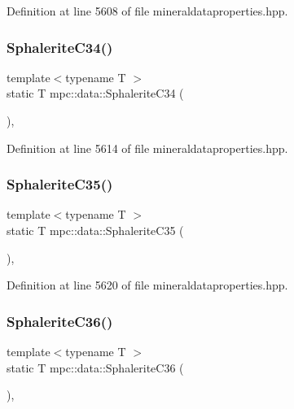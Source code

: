 Definition at line 5608 of file mineraldataproperties.\+hpp.

\mbox{\label{namespacempc_1_1data_afcf69c5d36c89b18b1465d54f28b648e}} 
\subsubsection{\texorpdfstring{Sphalerite\+C34()}{SphaleriteC34()}}
{\footnotesize\ttfamily template$<$typename T $>$ \\
static T mpc\+::data\+::\+Sphalerite\+C34 (\begin{DoxyParamCaption}{ }\end{DoxyParamCaption})\hspace{0.3cm}{\ttfamily [inline]}, {\ttfamily [static]}}



Definition at line 5614 of file mineraldataproperties.\+hpp.

\mbox{\label{namespacempc_1_1data_aa2576bc083b3212de07d691f4a7da4db}} 
\subsubsection{\texorpdfstring{Sphalerite\+C35()}{SphaleriteC35()}}
{\footnotesize\ttfamily template$<$typename T $>$ \\
static T mpc\+::data\+::\+Sphalerite\+C35 (\begin{DoxyParamCaption}{ }\end{DoxyParamCaption})\hspace{0.3cm}{\ttfamily [inline]}, {\ttfamily [static]}}



Definition at line 5620 of file mineraldataproperties.\+hpp.

\mbox{\label{namespacempc_1_1data_a10b24319fc3ffce14931390bdbd8327b}} 
\subsubsection{\texorpdfstring{Sphalerite\+C36()}{SphaleriteC36()}}
{\footnotesize\ttfamily template$<$typename T $>$ \\
static T mpc\+::data\+::\+Sphalerite\+C36 (\begin{DoxyParamCaption}{ }\end{DoxyParamCaption})\hspace{0.3cm}{\ttfamily [inline]}, {\ttfamily [static]}}



